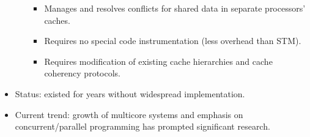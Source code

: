 \begin{itemize}
\begin{itemize}
\begin{itemize}
            \item Manages and resolves conflicts for shared data in separate processors' caches.
            \item Requires no special code instrumentation (less overhead than STM).
            \item Requires modification of existing cache hierarchies and cache coherency protocols.
        \end{itemize}
    \end{itemize}
    \item Status: existed for years without widespread implementation.
    \item Current trend: growth of multicore systems and emphasis on concurrent/parallel programming has prompted significant research.
\end{itemize}

